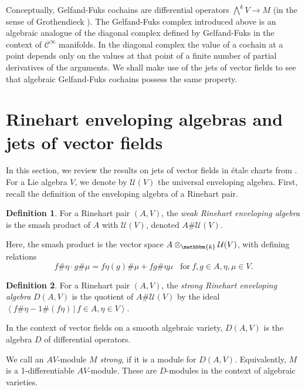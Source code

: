 \documentclass[12pt]{amsart}
\renewcommand{\k}{{\mathbbm{k}}}
\newcommand{\U}{{\mathcal{U}}}
\renewcommand{\sp}{{\#}}
\theoremstyle{definition}
\newtheorem{definition}{Definition}[section]
\begin{document}
Conceptually, Gelfand-Fuks cochains are differential operators
$\bigwedge^k V \rightarrow M$ (in the sense of Grothendieck \cite{Grothendieck}). The Gelfand-Fuks complex introduced above is an algebraic analogue of the diagonal complex defined by Gelfand-Fuks \cite{GelfandFuks} in the context of $\mathcal{C}^\infty$ manifolds. In the diagonal complex the value of a cochain at a point depends only on the values at that point of a finite number of partial derivatives of the arguments. We shall make use of the jets of vector fields to see that algebraic Gelfand-Fuks cochains possess the same property.   


\section{Rinehart enveloping algebras and jets of vector fields}\label{section:background}

In this section, we review the results on jets of vector fields in \'etale charts from  \cite{BilligIngalls}. For a Lie algebra $V$, we denote by $\U(V)$ the universal enveloping algebra. First, recall the definition of the enveloping algebra of a Rinehart pair.

\begin{definition}
For a Rinehart pair $(A, V)$, the \emph{weak Rinehart enveloping algebra} is the smash product of $A$ with $\U(V)$, denoted $A \sp \U(V)$. 
\end{definition}

Here, the smash product is the vector space $A \otimes_{\k} \U(V)$, with defining relations
\[
f \sp \eta \cdot g \sp \mu = f \eta(g) \sp \mu + fg \sp \eta \mu
\ \ \ \ \text{for} \  f,g \in A, \eta, \mu \in V.
\]

\begin{definition}
For a Rinehart pair $(A, V)$, the \emph{strong Rinehart enveloping algebra} $D(A,V)$ is the quotient of $A \sp \U(V)$ by the ideal $\left< f \sp \eta - 1 \sp (f\eta) \, | \, f\in A, \eta \in V \right>$. 
\end{definition}

In the context of vector fields on a smooth algebraic variety, $D(A,V)$ is the algebra $D$ of differential operators. 

We call an $AV$-module $M$ \emph{strong}, if it is a module for $D(A,V)$. Equivalently, $M$ is a 1-differentiable $AV$-module. These are $D$-modules in the context of algebraic varieties.
\end{document}
